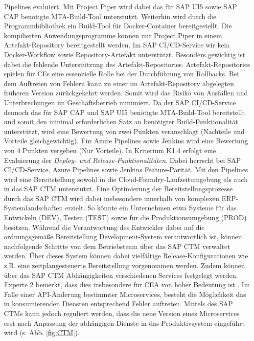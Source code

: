 Pipelines evaluiert. Mit Project Piper wird dabei das für SAP UI5 sowie SAP CAP benötigte MTA-Build-Tool unterstützt. Weiterhin wird durch die Programmbibliothek ein Build-Tool für Docker-Container bereitgestellt.  Die kompilierten Anwendungsprogramme können mit Project Piper in einem Artefakt-Repository bereitgestellt werden. Im SAP CI/CD-Service wir kein Docker-Workflow sowie Repository-Artefakt unterstützt. Besonders gewichtig ist dabei die fehlende Unterstützung des Artefakt-Repositories. Artefakt-Repositories spielen für CEs eine essenzielle Rolle bei der Durchführung von Rollbacks. Bei dem Auftreten von Fehlern kann zu einer im Artefakt-Repository abgelegten früheren Version zurückgekehrt werden. Somit wird das Risiko von Ausfällen und Unterbrechungen im Geschäftsbetrieb minimiert. Da der SAP CI/CD-Service dennoch das für SAP CAP und SAP UI5 benötigte MTA-Build-Tool bereitstellt und somit den minimal erforderlichen Satz an benötigter Build-Funktionalität unterstützt, wird eine Bewertung von zwei Punkten veranschlagt (Nachteile und Vorteile gleichgewichtig). Für Azure Pipelines sowie Jenkins wird eine Bewertung von 4 Punkten vergeben (Nur Vorteile). In Kriterium K1.4 erfolgt eine Evaluierung der \textit{Deploy- und Release-Funktionalitäten}. Dabei herrscht bei SAP CI/CD-Service, Azure Pipelines sowie Jenkins Feature-Parität. Mit den Pipelines wird eine Bereitstellung sowohl in die Cloud-Foundry-Laufzeitumgebung als auch in das SAP CTM unterstützt. Eine Optimierung der Bereitstellungsprozesse durch das SAP CTM wird dabei insbesondere innerhalb von komplexen ERP-Systemlandschaften erzielt. So könnte ein Unternehmen etwa Systeme für das Entwickeln (DEV), Testen (TEST) sowie für die Produktionsumgebung (PROD) besitzen. Während die Verantwortung des Entwickler dabei auf die ordnungsgemäße Bereitstellung Development-System verantwortlich ist, können nachfolgende Schritte von dem Betriebsteam über das SAP CTM verwaltet werden. Über dieses System können dabei vielfältige Release-Konfigurationen wie z.B. eine zeitplangesteuerte Bereitstellung vorgenommen werden. Zudem können über das SAP CTM Abhängigkeiten  verschiedenen Services festgelegt werden. Experte 2 bemerkt, dass dies insbesondere für CEA von hoher Bedeutung ist \cite[Z. 64]{ProductManagerSAPHyperspaceCICD.}. Im Falle einer API-Änderung bestimmter Microservices, besteht die Möglichkeit das in konsumierenden Diensten entsprechend Fehler auftreten. Mittels des SAP CTMs kann jedoch reguliert werden, dass die neue Version eines Microservices erst nach Anpassung der abhängigen Dienste in das Produktivsystem eingeführt wird (s. Abb. \ref*{fig:CTM}).
